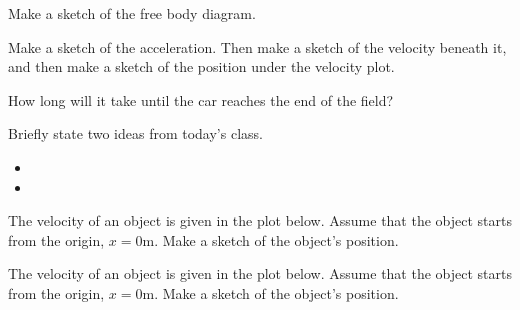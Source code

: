 \begin{problem}
  \begin{subproblem}
  \item Make a sketch of the free body diagram.
    \vspace{8em}
  \item Make a sketch of the acceleration. Then make a sketch of the
    velocity beneath it, and then make a sketch of the position under
    the velocity plot.
    \vfill
    \clearpage
  \item How long will it take until the car reaches the end of the
    field?
    \vfill
  \end{subproblem}

\end{problem}

\postClass

\begin{problem}
\item Briefly state two ideas from today's class.
  \begin{itemize}
  \item 
  \item 
  \end{itemize}
\item 
  \begin{subproblem}
    \item
  \end{subproblem}
\end{problem}



\begin{problem}
\item The velocity of an object is given in the plot
  below. Assume that the object starts from the origin, $x=0$m. Make a
  sketch of the object's position.

  \scalebox{0.7}{}

  \clearpage

\item The velocity of an object is given in the plot
  below. Assume that the object starts from the origin, $x=0$m. Make a
  sketch of the object's position.

  \scalebox{0.7}{}

\end{problem}


